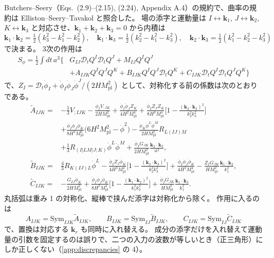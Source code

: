 \documentclass[a4paper,11pt]{ltjsarticle}
\newcommand{\Mpl}{M_{\mathrm{pl}}}
\newcommand{\Dt}{\mathcal{D}_t}
\begin{document}
Butchers--Seery\cite{BS2018}（Eqs.~(2.9)--(2.15), (2.24), Appendix A.4）の規約で、曲率の規約は Elliston--Seery--Tavakol\cite{EST2012} と照合した。
場の添字と運動量は $I\leftrightarrow\mathbf k_1$, $J\leftrightarrow\mathbf k_2$, $K\leftrightarrow\mathbf k_3$ と対応させ、$\mathbf k_1+\mathbf k_2+\mathbf k_3=0$ から内積は
\[
\mathbf k_1\!\cdot\!\mathbf k_2=\tfrac12(k_3^2-k_1^2-k_2^2),\quad
\mathbf k_1\!\cdot\!\mathbf k_3=\tfrac12(k_2^2-k_1^2-k_3^2),\quad
\mathbf k_2\!\cdot\!\mathbf k_3=\tfrac12(k_1^2-k_2^2-k_3^2)
\]
で決まる。
3次の作用は
\begin{align*}
S_\phi=\frac12\int dt\,a^3\Big\{&G_{IJ}\Dt Q^I\Dt Q^J+M_{IJ}Q^IQ^J\\
&+A_{IJK}Q^IQ^JQ^K+B_{IJK}Q^IQ^J\Dt Q^K+C_{IJK}\Dt Q^I\Dt Q^JQ^K\Big\}
\end{align*}
で、$Z_I=\Dt\dot\phi_I+\dot\phi_I\dot\phi_J\dot\phi^J/(2H\Mpl^2)$ として、対称化する前の係数は次のとおりである。
\begin{align*}
\widetilde A_{IJK}={}&-\frac13V_{;IJK}-\frac{\dot\phi_IV_{;JK}}{2H\Mpl^2}+\frac{\dot\phi_I\dot\phi_JZ_K}{4H^2\Mpl^4}
+\frac{\dot\phi_IZ_JZ_K}{8H^3\Mpl^4}\Big[1-\frac{(\mathbf k_2\cdot\mathbf k_3)^2}{k_2^2k_3^2}\Big]\\
&+\frac{\dot\phi_I\dot\phi_J\dot\phi_K}{8H^3\Mpl^6}\big(6H^2\Mpl^2-\dot\phi^2\big)
-\frac{\dot\phi_K\dot\phi^L\dot\phi^M}{2H\Mpl^2}R_{L(IJ)M}\\
&+\frac13R_{(I|LM|J;K)}\dot\phi^L\dot\phi^M
+\frac{\dot\phi_IG_{JK}}{2H\Mpl^2}\frac{\mathbf k_2\cdot\mathbf k_3}{a^2},\\
\widetilde B_{IJK}={}&\frac43R_{K(IJ)L}\dot\phi^L-\frac{\dot\phi_IZ_J\dot\phi_K}{4H^3\Mpl^4}\Big[1-\frac{(\mathbf k_2\cdot\mathbf k_3)^2}{k_2^2k_3^2}\Big]
+\frac{\dot\phi_I\dot\phi_J\dot\phi_K}{4H^2\Mpl^4}-\frac{Z_IG_{JK}}{H\Mpl^2}\frac{\mathbf k_1\cdot\mathbf k_2}{k_1^2},\\
\widetilde C_{IJK}={}&-\frac{G_{IJ}\dot\phi_K}{2H\Mpl^2}+\frac{\dot\phi_I\dot\phi_J\dot\phi_K}{8H^3\Mpl^4}\Big[1-\frac{(\mathbf k_1\cdot\mathbf k_2)^2}{k_1^2k_2^2}\Big]
+\frac{\dot\phi_IG_{JK}}{H\Mpl^2}\frac{\mathbf k_1\cdot\mathbf k_3}{k_1^2}.
\end{align*}
丸括弧は重み 1 の対称化、縦棒で挟んだ添字は対称化から除く。
作用に入るのは
\[
A_{IJK}=\mathrm{Sym}_{IJK}\widetilde A_{IJK},\qquad B_{IJK}=\mathrm{Sym}_{IJ}\widetilde B_{IJK},\qquad C_{IJK}=\mathrm{Sym}_{IJ}\widetilde C_{IJK}
\]
で、置換は対応する $\mathbf k_r$ も同時に入れ替える。
成分の添字だけを入れ替えて運動量の引数を固定するのは誤りで、二つの入力の波数が等しいとき（正三角形）にしか正しくない（\ref{app:discrepancies} の 4）。
\end{document}
